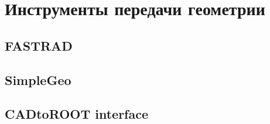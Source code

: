 \section{Инструменты передачи геометрии}\label{sec:ExistSols}

\subsection{FASTRAD}\label{sec:secFastrad}

\subsection{SimpleGeo}\label{sec:secSimpleGeo}

\subsection{CADtoROOT interface}\label{sec:secCinzia}
